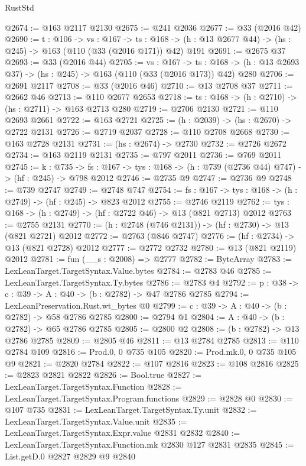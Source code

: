 \begin{lexlean}{RustStd}
\begin{coremodule}
@2674 := @163 @2117 @2130
@2675 := @241 @2036
@2677 := @33 (@2016 @42)
@2690 := {t : @106} ->
  {vs : @167} ->
  {ts : @168} -> (h : @13 @2677 @44) -> (hs : @245) -> @163 (@110 (@33 (@2016 @171)) @42) @191
@2691 := @2675 @37
@2693 := @33 (@2016 @44)
@2705 := {vs : @167} ->
  {ts : @168} -> (h : @13 @2693 @37) -> (hs : @245) -> @163 (@110 (@33 (@2016 @173)) @42) @280
@2706 := @2691 @2117
@2708 := @33 (@2016 @46)
@2710 := @13 @2708 @37
@2711 := @2662 @46
@2713 := @110 @2677 @2653
@2718 := {ts : @168} -> (h : @2710) -> (hs : @2711) -> @163 @2713 @280
@2719 := @2706 @2130
@2721 := @110 @2693 @2661
@2722 := @163 @2721
@2725 := (h : @2039) -> (hs : @2670) -> @2722 @2131
@2726 := @2719 @2037
@2728 := @110 @2708 @2668
@2730 := @163 @2728 @2131
@2731 := (hs : @2674) -> @2730
@2732 := @2726 @2672
@2734 := @163 @2119 @2131
@2735 := @797 @2011
@2736 := @769 @2011
@2745 := {k : @735} ->
  {fs : @167} -> {tys : @168} -> (h : @739 (@2736 @44) @747) -> (hf : @245) -> @798 @2012
@2746 := @2735 @9
@2747 := @2736 @9
@2748 := @739 @2747
@2749 := @2748 @747
@2754 := {fs : @167} -> {tys : @168} -> (h : @2749) -> (hf : @245) -> @823 @2012
@2755 := @2746 @2119
@2762 := {tys : @168} -> (h : @2749) -> (hf : @2722 @46) -> @13 (@821 @2713) @2012
@2763 := @2755 @2131
@2770 := (h : @2748 (@746 @2131)) -> (hf : @2730) -> @13 (@821 @2721) @2012
@2772 := @2763 (@846 @2747)
@2776 := (hf : @2734) -> @13 (@821 @2728) @2012
@2777 := @2772 @2732
@2780 := @13 (@821 @2119) @2012
@2781 := fun (__s : @2008) => @2777
@2782 := ByteArray
@2783 := LexLeanTarget.TargetSyntax.Value.bytes
@2784 := @2783 @46
@2785 := LexLeanTarget.TargetSyntax.Ty.bytes
@2786 := @2783 @4
@2792 := {p : @38} -> {c : @39} -> {A : @40} -> (b : @2782) -> @47 @2786 @2785
@2794 := LexLeanPreservation.Rust.wt_bytes @0
@2799 := {c : @39} -> {A : @40} -> (b : @2782) -> @58 @2786 @2785
@2800 := @2794 @1
@2804 := {A : @40} -> (b : @2782) -> @65 @2786 @2785
@2805 := @2800 @2
@2808 := (b : @2782) -> @13 @2786 @2785
@2809 := @2805 @46
@2811 := @13 @2784 @2785
@2813 := @110 @2784 @109
@2816 := Prod.{0, 0} @735 @105
@2820 := Prod.mk.{0, 0} @735 @105 @9
@2821 := @2820 @2784
@2822 := @107 @2816
@2823 := @108 @2816
@2825 := @2823 @2821 @2822
@2826 := Bool.true
@2827 := LexLeanTarget.TargetSyntax.Function
@2828 := LexLeanTarget.TargetSyntax.Program.functions
@2829 := @2828 @0
@2830 := @107 @735
@2831 := LexLeanTarget.TargetSyntax.Ty.unit
@2832 := LexLeanTarget.TargetSyntax.Value.unit
@2835 := LexLeanTarget.TargetSyntax.Expr.value @2831 @2832
@2840 := LexLeanTarget.TargetSyntax.Function.mk @2830 @127 @2831 @2835
@2845 := List.getD.{0} @2827 @2829 @9 @2840

\end{coremodule}
\end{lexlean}
